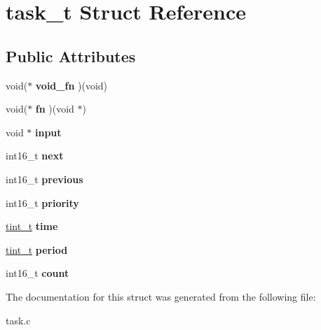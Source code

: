 \hypertarget{structtask__t}{\section{task\+\_\+t Struct Reference}
\label{structtask__t}
}
\subsection*{Public Attributes}
\begin{DoxyCompactItemize}
\item 
\hypertarget{structtask__t_a136858b0075aaa5af17610fc1790e9a7}{void($\ast$ {\bfseries void\+\_\+fn} )(void)}\label{structtask__t_a136858b0075aaa5af17610fc1790e9a7}

\item 
\hypertarget{structtask__t_a1ad98b10a7ef48c2ec66f19aad816928}{void($\ast$ {\bfseries fn} )(void $\ast$)}\label{structtask__t_a1ad98b10a7ef48c2ec66f19aad816928}

\item 
\hypertarget{structtask__t_a64a4d18da08212a09962dae6c94233b2}{void $\ast$ {\bfseries input}}\label{structtask__t_a64a4d18da08212a09962dae6c94233b2}

\item 
\hypertarget{structtask__t_a5a2c3dda7e4cba39a6909d3a8400c315}{int16\+\_\+t {\bfseries next}}\label{structtask__t_a5a2c3dda7e4cba39a6909d3a8400c315}

\item 
\hypertarget{structtask__t_a84250af57fee7a598ab0c538706047c3}{int16\+\_\+t {\bfseries previous}}\label{structtask__t_a84250af57fee7a598ab0c538706047c3}

\item 
\hypertarget{structtask__t_a7cefa5d37b7d75d361b3873ed74817d0}{int16\+\_\+t {\bfseries priority}}\label{structtask__t_a7cefa5d37b7d75d361b3873ed74817d0}

\item 
\hypertarget{structtask__t_a61f51bd6929812c58678b63183215b52}{\hyperlink{group__timing_gaef97c9386393beb1be4ed0b1513ee481}{tint\+\_\+t} {\bfseries time}}\label{structtask__t_a61f51bd6929812c58678b63183215b52}

\item 
\hypertarget{structtask__t_a441169a054d85568944bfd6d0fff6928}{\hyperlink{group__timing_gaef97c9386393beb1be4ed0b1513ee481}{tint\+\_\+t} {\bfseries period}}\label{structtask__t_a441169a054d85568944bfd6d0fff6928}

\item 
\hypertarget{structtask__t_a6b34c99b483184d44eaf2068e35b2a23}{int16\+\_\+t {\bfseries count}}\label{structtask__t_a6b34c99b483184d44eaf2068e35b2a23}

\end{DoxyCompactItemize}


The documentation for this struct was generated from the following file\+:\begin{DoxyCompactItemize}
\item 
task.\+c\end{DoxyCompactItemize}

